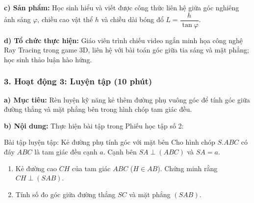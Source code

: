 \documentclass[12pt, a4paper]{article}
\begin{document}
\noindent \textbf{c) Sản phẩm:}
Học sinh hiểu và viết được công thức liên hệ giữa góc nghiêng ánh sáng $\varphi$, chiều cao vật thể $h$ và chiều dài bóng đổ $L = \dfrac{h}{\tan \varphi}$.

\noindent \textbf{d) Tổ chức thực hiện:}
Giáo viên trình chiếu video ngắn minh họa công nghệ Ray Tracing trong game 3D, liên hệ với bài toán góc giữa tia sáng và mặt phẳng; học sinh thảo luận hào hứng.

\subsubsection*{3. Hoạt động 3: Luyện tập (10 phút)}

\noindent \textbf{a) Mục tiêu:}
Rèn luyện kỹ năng kẻ thêm đường phụ vuông góc để tính góc giữa đường thẳng và mặt phẳng bên trong hình chóp tam giác đều.

\noindent \textbf{b) Nội dung:}
Thực hiện bài tập trong Phiếu học tập số 2:
\begin{pedabox}{Bài tập luyện tập: Kẻ đường phụ tính góc với mặt bên}
Cho hình chóp $S.ABC$ có đáy $ABC$ là tam giác đều cạnh $a$. Cạnh bên $SA \perp (ABC)$ và $SA = a$.
\begin{enumerate}[leftmargin=0.6cm]
    \item Kẻ đường cao $CH$ của tam giác $ABC$ ($H \in AB$). Chứng minh rằng $CH \perp (SAB)$.
    \item Tính số đo góc giữa đường thẳng $SC$ và mặt phẳng $(SAB)$.
\end{enumerate}
\end{pedabox}
\end{document}
